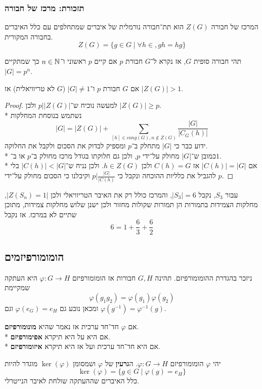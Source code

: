 \subsubsection{תזכורת: מרכז של חבורה}
המרכז של חבורה $Z(G)$ הוא תת־חבורה נורמלית של איברים שמתחלפים עם כלל האיברים בחבורה המקורית.
\[
	Z(G) = \{ g \in G \mid \forall h \in, g h = hg \}
\]

\begin{definition}[חבורת p]
	תהי חבורה סופית $G$, אז נקרא ל־$G$ חבורת $p$ אם קיים $p$ ראשוני ו־$n \in \mathbb{N}$ כך שמתקיים $|G| = p^n$.
\end{definition}
\begin{proposition}
	אם $G$ חבורת $p$ ו־$|G| \ne 1$ ($G$ לא טריוויאלית) אז $|Z(G)| > 1$.
\end{proposition}
\begin{proof}
	למעשה נוכיח ש־$p \Big| |Z(G)|$ ולכן $|Z(G)| \ge p$. \\*
	נשתמש בנוסחת המחלקות
	\[
		|G| = |Z(G)| + \sum_{[h] \in cong(G), n \notin Z(G)} \frac{|G|}{|C_G(h)|}
	\]
	ידוע כבר כי $|G|$ מתחלק ב־$p$ ומספיק לבדוק את הסכום ולקבל את החלוקה. \\*
	כמובן ש־$|G|$ מחולק על־ידי $p$, ולכן גם חלוקתו בגודל מרכז מחולק ב־$p$ או ב־$1$. \\*
	אם $|C(h)| = |G|$ אז $C(h) = G$ ולכן $h \in Z(G)$. ולכן נניח ש־$|C(h)| < |G|$ בלי להגביל את כלליות ההוכחה ונקבל כי $p \Big| \frac{|G|}{|C(h)}$ וקיבלנו כי הסכום מחולק על־ידי $p$.
\end{proof}
\begin{example}
	עבור $S_3$, נקבל $|S_3| = 6$, והמרכז כולל רק את האיבר הטריוויאלי ולכן $|Z(S_n) = 1|$,
	מחלקות הצמידות בתמורות הן תמורות שקולות מחזור ולכן ישנן שלוש מחלקות צמידות, מתוכן שתיים לא במרכז.
	אז נקבל
	\[
		6 = 1 + \frac{6}{3} + \frac{6}{2}
	\]
\end{example}

\subsection{הומומורפיזמים}
ניזכר בהגדרת ההומומורפיזם.
תהינה $G, H$ חבורות אז הומומורפיזם $\varphi : G \to H$ היא העתקה שמקיימת
\[
	\varphi(g_1 g_2) = \varphi(g_1) \varphi(g_2)
\]
ומכאן נובע גם $\varphi(e_G) = e_H$ וגם $\varphi(g^{-1}) = \varphi^{-1}(g)$.
\begin{definition}
	אם $\varphi$ חד־חד ערכית אז נאמר שהיא \textbf{מונומורפיזם}. \\*
	אם היא על היא תיקרא \textbf{אפימורפיזם}. \\*
	אם היא חד־חד ערכית ועל אז היא תיקרא \textbf{איזומורפיזם}.
\end{definition}
\begin{definition}[גרעין]
	יהי $\varphi$ הומומורפיזם $\varphi : G \to H$.
	ה\textbf{גרעין} של $\varphi$ ושמסומן $\ker(\varphi)$ מוגדר להיות
	\[
		\ker(\varphi) = \{ g \in G \mid \varphi(g) = e_H \}
	\]
	כלל האיברים שההעתקה שולחת לאיבר הנייטרלי.
\end{definition}

